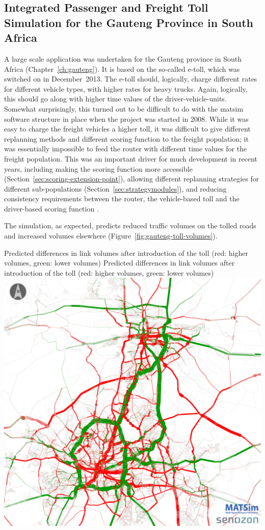 \subsection{Integrated Passenger and Freight Toll Simulation for the Gauteng Province in South Africa}
A large scale application was undertaken for the Gauteng province in South Africa (Chapter~\ref{ch:gauteng}). It is based on the so-called e-toll, which was switched on in December~2013. The e-toll should, logically, charge different rates for different vehicle types, with higher rates for heavy trucks. Again, logically, this should go along with higher time values of the driver-vehicle-units.  Somewhat surprisingly, this turned out to be difficult to do with the \gls{matsim} software structure in place when the project was started in 2008. While it was easy to charge the freight vehicles a higher toll, it was difficult to give different replanning methods and different scoring function to the freight population; it was essentially impossible to feed the router with different time values for the freight population. This was an important driver for much development in recent years, including making the scoring function more accessible (Section~\ref{sec:scoring-extension-point}), allowing different replanning strategies for different sub-populations (Section~\ref{sec:strategymodules}), and reducing consistency requirements between the router, the vehicle-based toll and the driver-based scoring function \citep{NagelKickhoeferJoubert2014HeterogeneousVoTsPROCEDIA}.

The simulation, as expected, predicts reduced traffic volumes on the tolled roads and increased volumes elsewhere (Figure~\ref{fig:gauteng-toll-volumes}).

\createfigure%
{Predicted differences in link volumes after introduction of the toll (red: higher volumes, green: lower volumes)}%
{Predicted differences in link volumes after introduction of the toll (red: higher volumes, green: lower volumes)}%
{\label{fig:gauteng-toll-volumes}}%
{\includegraphics[width=0.8\hsize,trim=0 0 0 0,clip]{extending/figures/roadpricing/abs-diff-link-vol-vot20-24h}}%
{}

